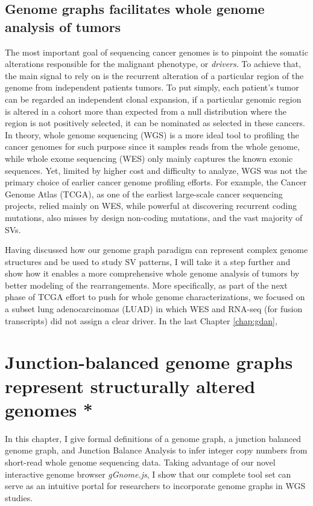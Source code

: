 \documentclass[phd,tocprelim]{cornell}
\begin{document}
\section{Genome graphs facilitates whole genome analysis of tumors}
The most important goal of sequencing cancer genomes is to pinpoint the somatic alterations responsible for the malignant phenotype, or \textit{drivers}. To achieve that, the main signal to rely on is the recurrent alteration of a particular region of the genome from independent patients tumors. To put simply, each patient's tumor can be regarded an independent clonal expansion, if a particular genomic region is altered in a cohort more than expected from a null distribution where the region is not positively selected, it can be nominated as selected in these cancers. In theory, whole genome sequencing (WGS) is a more ideal tool to profiling the cancer genomes for such purpose since it samples reads from the whole genome, while whole exome sequencing (WES) only mainly captures the known exonic sequences. Yet, limited by higher cost and difficulty to analyze, WGS was not the primary choice of earlier cancer genome profiling efforts. For example, the Cancer Genome Atlas (TCGA), as one of the earliest large-scale cancer sequencing projects, relied mainly on WES, while powerful at discovering recurrent coding mutations, also misses by design non-coding mutations, and the vast majority of SVs.

Having discussed how our genome graph paradigm can represent complex genome structures and be used to study SV patterns, I will take it a step further and show how it enables a more comprehensive whole genome analysis of tumors by better modeling of the rearrangements. More specifically, as part of the next phase of TCGA effort to push for whole genome characterizations, we focused on a subset lung adenocarcinomas (LUAD) in which WES and RNA-seq (for fusion transcripts) did not assign a clear driver. In the last Chapter \ref{chap:gdan}, 

\chapter{Junction-balanced genome graphs represent structurally altered genomes *} \label{chap:gg}
In this chapter, I give formal definitions of a genome graph, a junction balanced genome graph, and Junction Balance Analysis to infer integer copy numbers from short-read whole genome sequencing data. Taking advantage of our novel interactive genome browser \textit{gGnome.js}, I show that our complete tool set can serve as an intuitive portal for researchers to incorporate genome graphs in WGS studies. 
\end{document}
